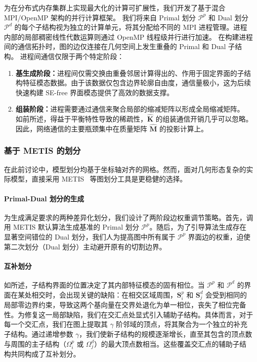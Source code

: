 为在分布式内存集群上实现最大化的计算可扩展性，我们开发了基于混合 MPI/OpenMP 架构的并行计算框架。
我们将来自 Primal 划分 $\mathcal{P}^p$ 和 Dual 划分 $\mathcal{P}^d$ 的每个子结构视为独立的计算单元，将其分配给不同的 MPI 进程管理。进程内部的局部稠密线性代数运算则通过 OpenMP 线程级并行进行加速。
在构建进程间的通信拓扑时，图的边仅连接在几何空间上发生重叠的 Primal 和 Dual 子结构。
进程间通信仅限于两个特定阶段：
\begin{enumerate}
    \item \textbf{基生成阶段：}进程间仅需交换由重叠邻居计算得出的、作用于固定界面的子结构特征模态数据。由于该数据仅包含边界轮廓自由度，通信量极小，这为后续快速构建 SE-free 界面模态提供了高效的数据支撑。
    \item \textbf{组装阶段：}进程需要通过通信来聚合局部的缩减矩阵以形成全局缩减矩阵。
    如前所述，得益于平衡特性导致的稀疏性，$\hat{\mathbf{K}}$ 的组装通信开销几乎可以忽略。
    因此，网络通信的主要瓶颈集中在质量矩阵 $\hat{\mathbf{M}}$ 的投影计算上。
\end{enumerate}

\subsubsection{基于 METIS 的划分}\label{sec:metis-partition}

在此前讨论中，模型划分均基于坐标轴对齐的网格。然而，面对几何形态复杂的实际模型，直接采用 METIS~\cite{Karypis1997METIS} 等图划分工具是更稳健的选择。

\paragraph{Primal-Dual 划分的生成}
为生成满足要求的两种差异化划分，我们设计了两阶段边权重调节策略。首先，调用 METIS 默认算法生成基准的 Primal 划分 $\mathcal{P}^p$。随后，为了引导算法生成存在显著空间错位的 Dual 划分，我们人为提高图中所有属于 $\mathcal{P}^p$ 界面边的权重，迫使第二次划分（Dual 划分）主动避开原有的切割边界。

\paragraph{互补划分}
如所述，子结构界面的位置决定了其内部特征模态的固有相位。当 $\mathcal{P}^p$ 和 $\mathcal{P}^d$ 的界面在某处相交时，会出现关键的缺陷：在相交区域周围，$\mathbf{S}_i^p$ 和 $\mathbf{S}^d_j$ 会受到相同的局部零边界约束，导致这两个基向量在交界处退化为单一相位，丧失了相位完备性。为修复这一局部缺陷，我们在交汇点处显式引入辅助子结构。具体而言，对于每一个交汇点，我们在图上提取其 $\gamma$ 阶邻域的顶点，将其聚合为一个独立的补充子结构。通过递增参数 $\gamma$，我们使新子结构的规模逐渐增长，直至其包含的顶点数与周围的主子结构（$\Omega_i^p$ 或 $\Omega_j^d$）的最大顶点数相当。这些覆盖交汇点的辅助子结构共同构成了互补划分。

